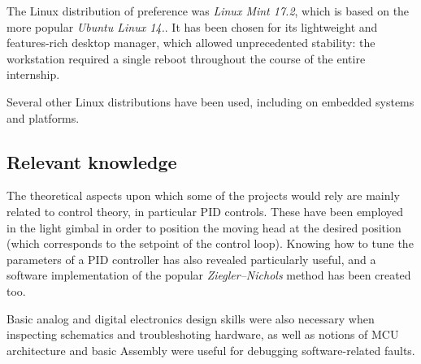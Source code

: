 The Linux distribution of preference was \emph{Linux Mint 17.2}, which is based on the more popular \emph{Ubuntu Linux 14.}.
It has been chosen for its lightweight and features-rich desktop manager, which allowed unprecedented stability: the workstation required a single reboot throughout the course of the entire internship.

Several other Linux distributions have been used, including on embedded systems and platforms.


\subsection{Relevant knowledge}
The theoretical aspects upon which some of the projects would rely are mainly related to control theory, in particular PID controls.
These have been employed in the light gimbal in order to position the moving head at the desired position (which corresponds to the setpoint of the control loop).
Knowing how to tune the parameters of a PID controller has also revealed particularly useful, and a software implementation of the popular \emph{Ziegler–Nichols} method has been created too.

Basic analog and digital electronics design skills were also necessary when inspecting schematics and troubleshoting hardware, as well as notions of MCU architecture and basic Assembly were useful for debugging software-related faults. 